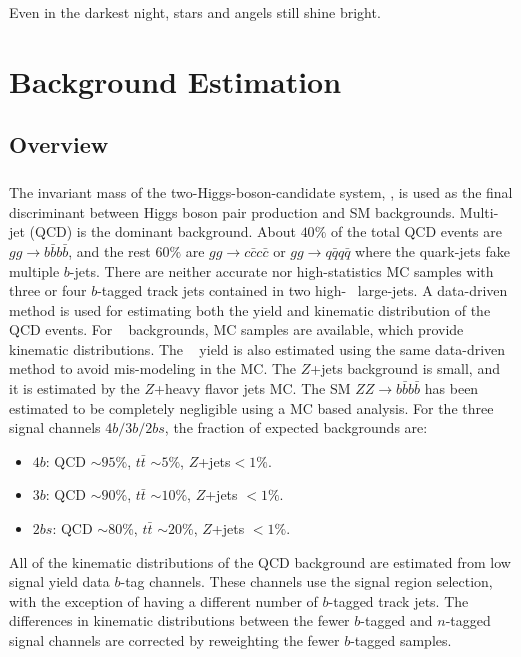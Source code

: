 \begin{savequote}[75mm]
Even in the darkest night, stars and angels still shine bright.   
\end{savequote}


\chapter{Background Estimation}

\section{Overview}
\paragraph{}
The invariant mass of the two-Higgs-boson-candidate system, \mtwoJ, is used as the final discriminant between Higgs boson pair production and SM backgrounds.
Multi-jet (QCD) is the dominant background.
About $40\%$ of the total QCD events are $gg \to b\bar{b}b\bar{b}$, and the rest $60\%$ are $gg \to c\bar{c}c\bar{c}$ or $gg \to q\bar{q}q\bar{q}$ where the quark-jets fake multiple $b$-jets.
There are neither accurate nor high-statistics MC samples with three or four $b$-tagged track jets contained in two high-\pt~ large-\R jets.
A data-driven method is used for estimating both the yield and kinematic distribution of the QCD events.
For \ttbar~ backgrounds, MC samples are available, which provide \ttbar~ kinematic distributions.
The \ttbar~ yield is also estimated using the same data-driven method to avoid mis-modeling in the MC.
The $Z$+jets background is small, and it is estimated by the $Z$+heavy flavor jets MC.
The SM $ZZ\to b\bar{b}b\bar{b}$ has been estimated to be completely negligible using a MC based analysis.
For the three signal channels $4b/3b/2bs$, the fraction of expected backgrounds are:
\begin{itemize}
	\item $4b$: QCD $\sim 95\%$, $t\bar{t}$ $\sim 5\%$, $Z$+jets$< 1\%$. 
	\item $3b$: QCD $\sim 90\%$, $t\bar{t}$ $\sim 10\%$, $Z$+jets $< 1\%$.  
	\item $2bs$: QCD $\sim 80\%$, $t\bar{t}$ $\sim 20\%$, $Z$+jets $< 1\%$.
\end{itemize}

All of the kinematic distributions of the QCD background are estimated from low signal yield data $b$-tag channels.
These channels use the signal region selection, with the exception of having a different number of $b$-tagged track jets.
The differences in kinematic distributions between the fewer $b$-tagged and $n$-tagged signal channels are corrected by reweighting the fewer $b$-tagged samples.

